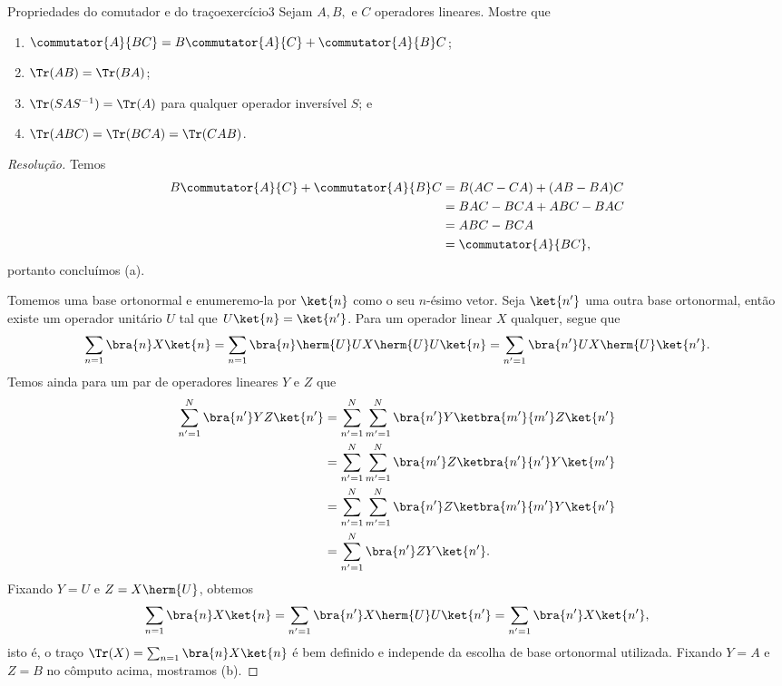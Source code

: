\begin{exercício}{Propriedades do comutador e do traço}{exercício3}
    Sejam \(A, B,\) e \(C\) operadores lineares. Mostre que
    \begin{enumerate}[label=(\alph*)]
        \item \(\commutator{A}{BC} = B\commutator{A}{C} + \commutator{A}{B}C\);
        \item \(\Tr(AB) = \Tr(BA)\);
        \item \(\Tr(S A S^{-1}) = \Tr(A)\) para qualquer operador inversível \(S\); e
        \item \(\Tr(ABC) = \Tr(BCA) = \Tr(CAB)\).
    \end{enumerate}
\end{exercício}
\begin{proof}[Resolução]
    Temos
    \begin{align*}
        B \commutator{A}{C} + \commutator{A}{B}C &= B(AC - CA) + (AB - BA)C\\
                                                 &= BAC - BCA + ABC - BAC\\
                                                 &= ABC - BCA\\
                                                 &= \commutator{A}{BC},
    \end{align*}
    portanto concluímos (a).

    Tomemos uma base ortonormal e enumeremo-la por \(\ket{n}\) como o seu \(n\)-ésimo vetor. Seja \(\ket{n'}\) uma outra base ortonormal, então existe um operador unitário \(U\) tal que \(U\ket{n} = \ket{n'}\). Para um operador linear \(X\) qualquer, segue que
    \begin{equation*}
        \sum_{n = 1} \bra{n} X \ket{n} = \sum_{n = 1} \bra{n} \herm{U}U X \herm{U}U \ket{n} = \sum_{n' = 1} \bra{n'} U X \herm{U} \ket{n'}.
    \end{equation*}
    Temos ainda para um par de operadores lineares \(Y\) e \(Z\) que
    \begin{align*}
        \sum_{n' = 1}^{N} \bra{n'} YZ \ket{n'} &= \sum_{n'=1}^{N} \sum_{m' = 1}^{N} \bra{n'} Y \ketbra{m'}{m'}Z\ket{n'}\\
                                            &= \sum_{n'=1}^{N}\sum_{m'=1}^{N} \bra{m'} Z \ketbra{n'}{n'} Y\ket{m'}\\
                                            &= \sum_{n'=1}^{N}\sum_{m'=1}^{N} \bra{n'} Z \ketbra{m'}{m'} Y\ket{n'}\\
                                            &= \sum_{n'=1}^{N} \bra{n'} ZY \ket{n'}.
    \end{align*}
    Fixando \(Y = U\) e \(Z = X\herm{U}\), obtemos
    \begin{equation*}
        \sum_{n=1} \bra{n} X \ket{n} = \sum_{n' = 1} \bra{n'} X\herm{U} U \ket{n'} = \sum_{n' = 1} \bra{n'} X \ket{n'},
    \end{equation*}
    isto é, o traço \(\Tr(X) = \sum_{n=1} \bra{n} X \ket{n}\) é bem definido e independe da escolha de base ortonormal utilizada. Fixando \(Y = A\) e \(Z = B\) no cômputo acima, mostramos (b).


\end{proof}
